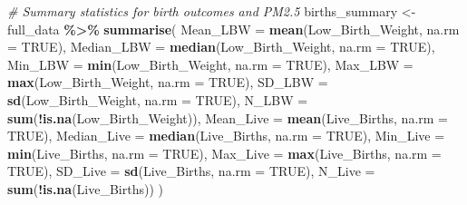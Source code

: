\documentclass[
]{article}
\newenvironment{Shaded}{\begin{snugshade}}{\end{snugshade}}
\newcommand{\AttributeTok}[1]{\textcolor[rgb]{0.13,0.29,0.53}{#1}}
\newcommand{\CommentTok}[1]{\textcolor[rgb]{0.56,0.35,0.01}{\textit{#1}}}
\newcommand{\ConstantTok}[1]{\textcolor[rgb]{0.56,0.35,0.01}{#1}}
\newcommand{\FunctionTok}[1]{\textcolor[rgb]{0.13,0.29,0.53}{\textbf{#1}}}
\newcommand{\NormalTok}[1]{#1}
\newcommand{\OtherTok}[1]{\textcolor[rgb]{0.56,0.35,0.01}{#1}}
\newcommand{\SpecialCharTok}[1]{\textcolor[rgb]{0.81,0.36,0.00}{\textbf{#1}}}
\begin{document}
\begin{Shaded}
\begin{Highlighting}[]
\CommentTok{\# Summary statistics for birth outcomes and PM2.5}
\NormalTok{births\_summary }\OtherTok{\textless{}{-}}\NormalTok{ full\_data }\SpecialCharTok{\%\textgreater{}\%} \FunctionTok{summarise}\NormalTok{(}
  \AttributeTok{Mean\_LBW =} \FunctionTok{mean}\NormalTok{(Low\_Birth\_Weight, }\AttributeTok{na.rm =} \ConstantTok{TRUE}\NormalTok{),}
  \AttributeTok{Median\_LBW =} \FunctionTok{median}\NormalTok{(Low\_Birth\_Weight, }\AttributeTok{na.rm =} \ConstantTok{TRUE}\NormalTok{),}
  \AttributeTok{Min\_LBW =} \FunctionTok{min}\NormalTok{(Low\_Birth\_Weight, }\AttributeTok{na.rm =} \ConstantTok{TRUE}\NormalTok{),}
  \AttributeTok{Max\_LBW =} \FunctionTok{max}\NormalTok{(Low\_Birth\_Weight, }\AttributeTok{na.rm =} \ConstantTok{TRUE}\NormalTok{),}
  \AttributeTok{SD\_LBW =} \FunctionTok{sd}\NormalTok{(Low\_Birth\_Weight, }\AttributeTok{na.rm =} \ConstantTok{TRUE}\NormalTok{),}
  \AttributeTok{N\_LBW =} \FunctionTok{sum}\NormalTok{(}\SpecialCharTok{!}\FunctionTok{is.na}\NormalTok{(Low\_Birth\_Weight)),}
  \AttributeTok{Mean\_Live =} \FunctionTok{mean}\NormalTok{(Live\_Births, }\AttributeTok{na.rm =} \ConstantTok{TRUE}\NormalTok{),}
  \AttributeTok{Median\_Live =} \FunctionTok{median}\NormalTok{(Live\_Births, }\AttributeTok{na.rm =} \ConstantTok{TRUE}\NormalTok{),}
  \AttributeTok{Min\_Live =} \FunctionTok{min}\NormalTok{(Live\_Births, }\AttributeTok{na.rm =} \ConstantTok{TRUE}\NormalTok{),}
  \AttributeTok{Max\_Live =} \FunctionTok{max}\NormalTok{(Live\_Births, }\AttributeTok{na.rm =} \ConstantTok{TRUE}\NormalTok{),}
  \AttributeTok{SD\_Live =} \FunctionTok{sd}\NormalTok{(Live\_Births, }\AttributeTok{na.rm =} \ConstantTok{TRUE}\NormalTok{),}
  \AttributeTok{N\_Live =} \FunctionTok{sum}\NormalTok{(}\SpecialCharTok{!}\FunctionTok{is.na}\NormalTok{(Live\_Births))}
\NormalTok{)}


\end{Highlighting}
\end{Shaded}
\end{document}
